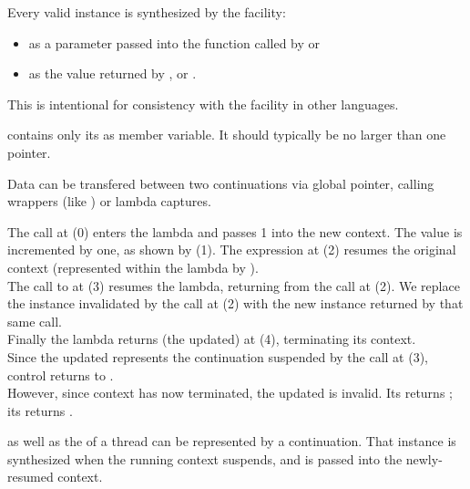 \label{design}


Every valid \cont instance is synthesized by the \callcc facility:
\begin{itemize}
    \item as a parameter passed into the function called by \callcc or \resumewith
    \item as the value returned by \callcc, \resume or \resumewith.
\end{itemize}

This is intentional for consistency with the \cc facility in other
languages.\cite{schemecallcc}\citecomma\cite{rubycallcc}



\cont contains only its  as member variable. It should
typically be no larger than one pointer.


\label{subsec:data}

Data can be transfered between two continuations via global pointer, calling
wrappers (like ) or lambda captures.

The  call at (0) enters the lambda and passes 1 into the
new context. The value is incremented by one, as shown by (1). The expression
 at (2) resumes the original context (represented
within the lambda by ).\\
The call to  at (3) resumes the lambda, returning from the
 call at (2). We replace the \cont instance 
invalidated by the \resume call at (2) with the new instance returned by that
same \resume call.\\
Finally the lambda returns (the updated)  at (4), terminating its
context.\\

Since the updated  represents the continuation suspended by the call at
(3), control returns to \main.\\

However, since context  has now terminated, the updated  is
invalid. Its \opbool returns ; its  returns
.


\label{subsec:main}

\main as well as the \entryfn of a thread can be represented by a continuation.
That \cont instance is synthesized when the running context suspends, and is
passed into the newly-resumed context.

